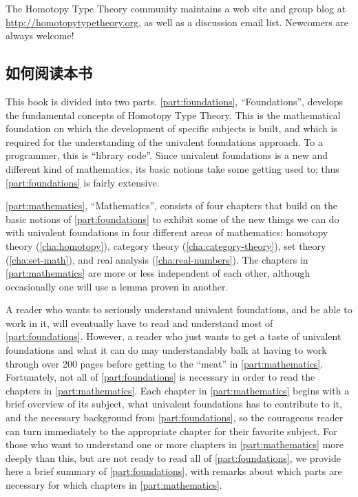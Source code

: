 The Homotopy Type Theory community maintains a web site and group blog at \url{http://homotopytypetheory.org}, as well as a discussion email list.
Newcomers are always welcome!


\subsection*{如何阅读本书}

This book is divided into two parts.
\cref{part:foundations}, ``Foundations'', develops the fundamental concepts of Homotopy Type Theory.
This is the mathematical foundation on which the development of specific subjects is built, and which is required for the understanding of the univalent foundations approach. To a programmer, this is ``library code''.
Since univalent foundations is a new and different kind of mathematics, its basic notions take some getting used to; thus \cref{part:foundations} is fairly extensive.

\cref{part:mathematics}, ``Mathematics'', consists of four chapters that build on the basic notions of \cref{part:foundations} to exhibit some of the new things we can do with univalent foundations in four different areas of mathematics: homotopy theory (\cref{cha:homotopy}), category theory (\cref{cha:category-theory}), set theory (\cref{cha:set-math}), and real analysis (\cref{cha:real-numbers}).
The chapters in \cref{part:mathematics} are more or less independent of each other, although occasionally one will use a lemma proven in another.

A reader who wants to seriously understand univalent foundations, and be able to work in it, will eventually have to read and understand most of \cref{part:foundations}.
However, a reader who just wants to get a taste of univalent foundations and what it can do may understandably balk at having to work through over 200 pages before getting to the ``meat'' in \cref{part:mathematics}.
Fortunately, not all of \cref{part:foundations} is necessary in order to read the chapters in \cref{part:mathematics}.
Each chapter in \cref{part:mathematics} begins with a brief overview of its subject, what univalent foundations has to contribute to it, and the necessary background from \cref{part:foundations}, so the courageous reader can turn immediately to the appropriate chapter for their favorite subject.
For those who want to understand one or more chapters in \cref{part:mathematics} more deeply than this, but are not ready to read all of \cref{part:foundations}, we provide here a brief summary of \cref{part:foundations}, with remarks about which parts are necessary for which chapters in \cref{part:mathematics}.

